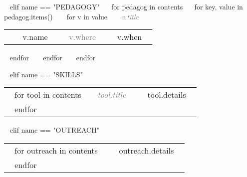 \begin{minipage}{\textwidth}

~{ elif name == "PEDAGOGY" }~
~{for pedagog in contents}~
  ~{ for key, value in pedagog.items() }~
    ~{ for v in value }~
        \textcolor{gray}{{\emph{~{{ v.title }}~}}} 
        \begin{tabular}{ p{} %
                        p{}
                        p{} 
                        p{}} %
        \small &  ~{{ v.name }}~ & {\hfill}\textcolor{gray}{\small{~{{ v.where }}~}} & {\hfill}\small{~{{ v.when }}~}\\ 
        \end{tabular}
      ~{ endfor }~
  ~{ endfor }~
~{ endfor }~ 

%
 
~{ elif name == "SKILLS" }~

\begin{tabular}{ @{} p{} p{135mm} @{} }
  ~{ for tool in contents }~
  \small \textcolor{gray}{{\emph{~{{ tool.title }}~}}} & {\small ~{{ tool.details }}~} \\
  ~{ endfor }~
\end{tabular}

%

~{ elif name == "OUTREACH" }~

\begin{tabular}{ @{} p{} p{} @{} }
  ~{ for outreach in contents }~
  \small \textcolor{gray}{{\emph{ }}} & {\small ~{{ outreach.details }}~} \\
  ~{ endfor }~
\end{tabular}



\end{minipage}
